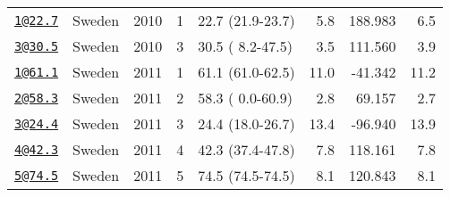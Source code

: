 \documentclass[]{article}
\begin{document}
\begin{longtable}[]{@{}llrrlrrr@{}}
\href{mailto:1@22.7}{\nolinkurl{1@22.7}} & Sweden & 2010 & 1 & 22.7
(21.9-23.7) & 5.8 & 188.983 & 6.5\tabularnewline
\href{mailto:3@30.5}{\nolinkurl{3@30.5}} & Sweden & 2010 & 3 & 30.5 (
8.2-47.5) & 3.5 & 111.560 & 3.9\tabularnewline
\href{mailto:1@61.1}{\nolinkurl{1@61.1}} & Sweden & 2011 & 1 & 61.1
(61.0-62.5) & 11.0 & -41.342 & 11.2\tabularnewline
\href{mailto:2@58.3}{\nolinkurl{2@58.3}} & Sweden & 2011 & 2 & 58.3 (
0.0-60.9) & 2.8 & 69.157 & 2.7\tabularnewline
\href{mailto:3@24.4}{\nolinkurl{3@24.4}} & Sweden & 2011 & 3 & 24.4
(18.0-26.7) & 13.4 & -96.940 & 13.9\tabularnewline
\href{mailto:4@42.3}{\nolinkurl{4@42.3}} & Sweden & 2011 & 4 & 42.3
(37.4-47.8) & 7.8 & 118.161 & 7.8\tabularnewline
\href{mailto:5@74.5}{\nolinkurl{5@74.5}} & Sweden & 2011 & 5 & 74.5
(74.5-74.5) & 8.1 & 120.843 & 8.1\tabularnewline
\bottomrule
\end{longtable}

\newpage
\end{document}

